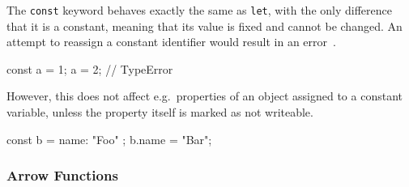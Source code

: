 The \texttt{const} keyword behaves exactly the same as \texttt{let}, with the only difference that it is a constant, meaning that its value is fixed and cannot be changed. An attempt to reassign a constant identifier would result in an error~\cite[p.~39]{YDKJS:ScopesAndClosures:Simpson:2014}.
\begin{JsCode}[numbers=none]
const a = 1;
a = 2; // TypeError
\end{JsCode}
However, this does not affect e.g.\ properties of an object assigned to a constant variable, unless the property itself is marked as not writeable.
\begin{JsCode}[numbers=none]
const b = { name: "Foo" };
b.name = "Bar";
\end{JsCode}



\subsubsection{Arrow Functions}

